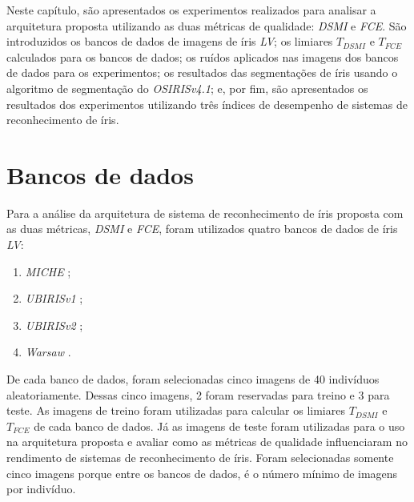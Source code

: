 
\par Neste capítulo, são apresentados os experimentos realizados para analisar a arquitetura proposta utilizando as duas métricas de qualidade: \textit{\acrshort{DSMI}} e \textit{\acrshort{FCE}}. São introduzidos os bancos de dados de imagens de íris \textit{\acrshort{LV}}; os limiares $T_{DSMI}$ e $T_{FCE}$ calculados para os bancos de dados; os ruídos aplicados nas imagens dos bancos de dados para os experimentos; os resultados das segmentações de íris usando o algoritmo de segmentação do \textit{OSIRISv4.1}; e, por fim, são apresentados os resultados dos experimentos utilizando três índices de desempenho de sistemas de reconhecimento de íris.


\section{Bancos de dados} \label{sec:experimentos:db}

\par Para a análise da arquitetura de sistema de reconhecimento de íris proposta com as duas métricas, \textit{\acrshort{DSMI}} e \textit{\acrshort{FCE}}, foram utilizados quatro bancos de dados de íris \textit{\acrshort{LV}}: 

\begin{enumerate}
    \item \textit{MICHE} \cite{marsico2017-MICHE-1, santada2016-MICHE-2, miche};
    \item \textit{UBIRISv1} \cite{proenca2005-ubirisv1, ubirisv1};
    \item \textit{UBIRISv2} \cite{proence2010-ubirisv2, ubirisv2};
    \item \textit{\acrfull{Warsaw}} \cite{trokielwicz2016-Warsaw, warsaw}.
\end{enumerate}

\par De cada banco de dados, foram selecionadas cinco imagens de 40 indivíduos aleatoriamente. Dessas cinco imagens, 2 foram reservadas para treino e 3 para teste. As imagens de treino foram utilizadas para calcular os limiares $T_{DSMI}$ e $T_{FCE}$ de cada banco de dados. Já as imagens de teste foram utilizadas para o uso na arquitetura proposta e avaliar como as métricas de qualidade influenciaram no rendimento de sistemas de reconhecimento de íris. Foram selecionadas somente cinco imagens porque entre os bancos de dados, é o número mínimo de imagens por indivíduo.


